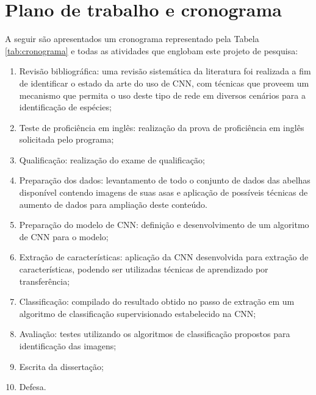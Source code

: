 \documentclass[
	12pt,				%
	oneside,			%
	a4paper,			%
	english,			%
	brazil				%
	]{abntex2ppgsi}
\begin{document}
\section{Plano de trabalho e cronograma}
A seguir são apresentados um cronograma representado pela Tabela \ref{tab:cronograma} e todas as atividades que englobam este projeto de pesquisa:

\begin{enumerate}
  \item Revisão bibliográfica: uma revisão sistemática da literatura foi realizada a fim de identificar o estado da arte do uso de CNN, com técnicas que proveem um mecanismo que permita o uso deste tipo de rede em diversos cenários para a identificação de espécies;
  \item Teste de proficiência em inglês: realização da prova de proficiência em inglês solicitada pelo programa;
  \item Qualificação: realização do exame de qualificação;
  \item Preparação dos dados: levantamento de todo o conjunto de dados das abelhas disponível contendo imagens de suas asas e aplicação de possíveis técnicas de aumento de dados para ampliação deste conteúdo.
  \item Preparação do modelo de CNN: definição e desenvolvimento de um algoritmo de CNN para o modelo;
  \item Extração de características: aplicação da CNN desenvolvida para extração de características, podendo ser utilizadas técnicas de aprendizado por transferência;
  \item Classificação: compilado do resultado obtido no passo de extração em um algoritmo de classificação supervisionado estabelecido na CNN;
  \item Avaliação: testes utilizando os algoritmos de classificação propostos para identificação das imagens;
  \item Escrita da dissertação;
  \item Defesa.
\end{enumerate}
\end{document}
